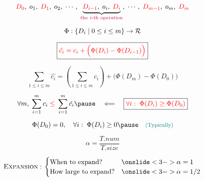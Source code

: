 
\begin{frame}{}
  \centerline{}
\end{frame}

\begin{frame}{}
  \[
    \textcolor{red}{D_0},\; o_1,\; \textcolor{red}{D_1},\; o_2,\; \cdots,\; \underbrace{\textcolor{red}{D_{i-1}},\; o_{i},\; \textcolor{red}{D_{i}}}_{\text{\textcolor{purple}{the $i$-th operation}}},\; 
    \cdots,\; \textcolor{red}{D_{m-1}},\; o_{m},\; \textcolor{red}{D_{m}}
  \]

  \pause
  \[
    \Phi: \left\{D_{i} \mid 0 \le i \le m\right\} \to \mathcal{R}
  \]

  \pause
  \[
    \boxed{\textcolor{red}{\hat{c_i} = c_i + \Big(\Phi(D_{i}) - \Phi(D_{i-1})\Big)}}
  \]

  \pause
  \[
    \sum_{1 \le i \le m} \hat{c_i} = \left( \sum_{1 \le i \le m} c_i \right) + \Big(\Phi(D_{m}) - \Phi(D_0) \Big)
  \]

  \pause
  \[
    \forall m,\; \sum_{i=1}^{m} c_i \red{\;\le\;} \sum_{i=1}^{m} \hat{c_i} \pause \quad\Longleftarrow\quad \boxed{\red{\forall i:\; \Phi(D_{i}) \ge \Phi(D_{0})}}
  \]

  \pause
  \[
    \Phi(D_{0}) = 0,\quad \forall i:\; \Phi(D_{i}) \ge 0 \pause \quad \text{\teal{\footnotesize (Typically)}}
  \]
\end{frame}

\begin{frame}{}
  \centerline{}

  \[
    \alpha = \frac{T.num}{T.size}
  \]

  \pause
  \vspace{0.30cm}
  \[
    \textsc{Expansion}: \left.
    \begin{cases}
      \text{When to expand?}		& \onslide<3->{\alpha = 1} \\
      \text{How large to expand?} 	& \onslide<3->{\alpha = 1/2}
    \end{cases}
    \right.
  \]


\end{frame}


